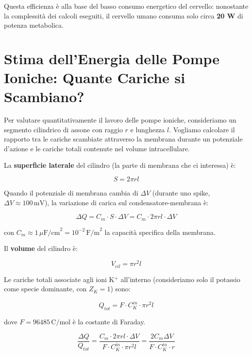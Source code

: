 Questa efficienza è alla base del basso consumo energetico del cervello: nonostante la complessità dei calcoli eseguiti, il cervello umano consuma solo circa \textbf{20 W} di potenza metabolica.

\section{Stima dell'Energia delle Pompe Ioniche: Quante Cariche si Scambiano?}

Per valutare quantitativamente il lavoro delle pompe ioniche, consideriamo un segmento cilindrico di assone con raggio $r$ e lunghezza $l$. Vogliamo calcolare il rapporto tra le cariche scambiate attraverso la membrana durante un potenziale d'azione e le cariche totali contenute nel volume intracellulare.



La \textbf{superficie laterale} del cilindro (la parte di membrana che ci interessa) è:

\begin{equation}
S = 2\pi r l
\end{equation}

Quando il potenziale di membrana cambia di $\Delta V$ (durante uno spike, $\Delta V \approx 100\,\text{mV}$), la variazione di carica sul condensatore-membrana è:

\begin{equation}
\Delta Q = C_m \cdot S \cdot \Delta V = C_m \cdot 2\pi r l \cdot \Delta V
\end{equation}

con $C_m \approx 1\,\mu\text{F/cm}^2 = 10^{-2}\,\text{F/m}^2$ la capacità specifica della membrana.



Il \textbf{volume} del cilindro è:

\begin{equation}
V_{cil} = \pi r^2 l
\end{equation}

Le cariche totali associate agli ioni K$^+$ all'interno (consideriamo solo il potassio come specie dominante, con $Z_K = 1$) sono:

\begin{equation}
Q_{tot} = F \cdot C_K^{in} \cdot \pi r^2 l
\end{equation}

dove $F = 96485\,\text{C/mol}$ è la costante di Faraday.



\begin{equation}
\frac{\Delta Q}{Q_{tot}} = \frac{C_m \cdot 2\pi r l \cdot \Delta V}{F \cdot C_K^{in} \cdot \pi r^2 l} = \frac{2 C_m \Delta V}{F \cdot C_K^{in} \cdot r}
\end{equation}


